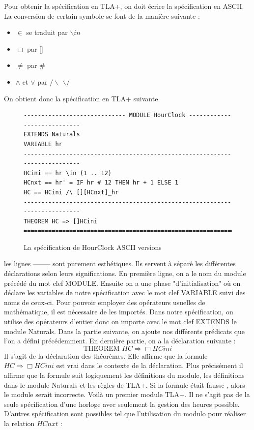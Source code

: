 \documentclass[12pt,a4paper]{article}
\begin{document}
Pour obtenir la spécification en TLA+, on doit écrire la spécification en ASCII. La conversion de certain symbole se font de la manière suivante :

\begin{itemize}
	\item $\in$ se traduit par $\backslash in$
	\item $\Box$ par []
	\item $\neq$ par \#
	\item $\land$ et $\lor$ par $/ \backslash$ $\backslash /$ 
\end{itemize}

On obtient donc la spécification en TLA+ suivante

\begin{figure}[ht]
\begin{lstlisting}[frame=single, basicstyle=\footnotesize]
----------------------------- MODULE HourClock ----------------------------
EXTENDS Naturals
VARIABLE hr
---------------------------------------------------------------------------
HCini == hr \in (1 .. 12)
HCnxt == hr' = IF hr # 12 THEN hr + 1 ELSE 1
HC == HCini /\ [][HCnxt]_hr
---------------------------------------------------------------------------
THEOREM HC => []HCini
===========================================================================

\end{lstlisting}
\caption{La spécification de HourClock ASCII versions}
\end{figure}

les lignes -------- sont purement esthétiques. Ils servent à séparé les différentes déclarations selon leurs significations. En première ligne, on a le nom du module précédé du mot clef MODULE.
Ensuite on a une phase "d'initialisation" où on déclare les variables de notre spécification avec le mot clef VARIABLE suivi des noms de ceux-ci. Pour pouvoir employer des opérateurs usuelles de mathématique, il est nécessaire de les importés. Dans notre spécification, on utilise des opérateurs d'entier donc on importe avec le mot clef EXTENDS le module Naturals.
Dans la partie suivante, on ajoute nos différents prédicats que l'on a défini précédemment.
En dernière partie, on a la déclaration suivante :
$$ \text{THEOREM } HC \Rightarrow \Box HCini$$
Il s'agit de la déclaration des théorèmes. Elle affirme que la formule $HC \Rightarrow \Box HCini$ est vrai dans le contexte de la déclaration. Plus précisément il affirme que la formule suit logiquement les définitions du module, les définitions dans le module Naturals et les règles de TLA+. Si la formule était fausse , alors le module serait incorrecte.
Voilà un premier module TLA+. Il ne s'agit pas de la seule spécification d'une horloge avec seulement la gestion des heures possible. D'autres spécification sont possibles tel que l'utilisation du modulo pour réaliser la relation $HCnxt$ :
\end{document}
